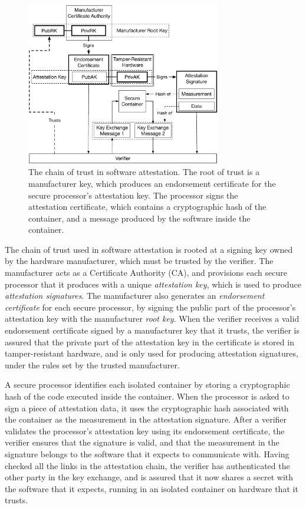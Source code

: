 \begin{figure}[hbt]
  \centering
  \includegraphics[width=85mm]{figures/generic_attestation_chain.pdf}
  \caption{
    The chain of trust in software attestation. The root of trust is a
    manufacturer key, which produces an endorsement certificate for the secure
    processor's attestation key. The processor signs the attestation
    certificate, which contains a cryptographic hash of the container, and a
    message produced by the software inside the container.
  }
  \label{fig:generic_attestation_chain}
\end{figure}

The chain of trust used in software attestation is rooted at a signing key
owned by the hardware manufacturer, which must be trusted by the verifier. The
manufacturer acts as a Certificate Authority (CA), and provisions each secure
processor that it produces with a unique \textit{attestation key}, which is
used to produce \textit{attestation signatures}. The manufacturer also
generates an \textit{endorsement certificate} for each secure processor,
by signing the public part of the processor's attestation key with the
manufacturer \textit{root key}. When the verifier receives a valid endorsement
certificate signed by a manufacturer key that it trusts, the verifier is
assured that the private part of the attestation key in the certificate is
stored in tamper-resistant hardware, and is only used for producing attestation
signatures, under the rules set by the trusted manufacturer.

A secure processor identifies each isolated container by storing a
cryptographic hash of the code executed inside the container. When the
processor is asked to sign a piece of attestation data, it uses the
cryptographic hash associated with the container as the measurement in the
attestation signature. After a verifier validates the processor's attestation
key using its endorsement certificate, the verifier ensures that the signature
is valid, and that the measurement in the signature belongs to the software
that it expects to communicate with. Having checked all the links in the
attestation chain, the verifier has authenticated the other party in the key
exchange, and is assured that it now shares a secret with the software that it
expects, running in an isolated container on hardware that it trusts.


